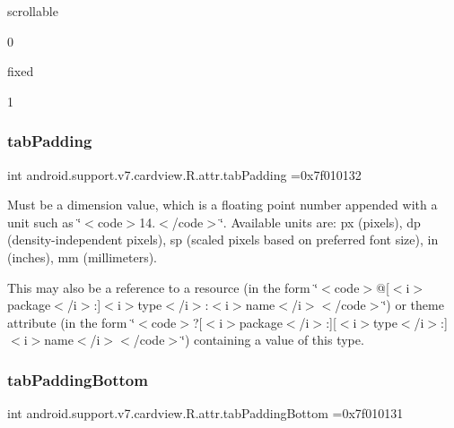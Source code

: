 {\ttfamily scrollable}

0

{\ttfamily fixed}

1\mbox{\label{classandroid_1_1support_1_1v7_1_1cardview_1_1R_1_1attr_a212c434939a73d19c290434e3cb6c8e5}} 
\subsubsection{\texorpdfstring{tab\+Padding}{tabPadding}}
{\footnotesize\ttfamily int android.\+support.\+v7.\+cardview.\+R.\+attr.\+tab\+Padding =0x7f010132\hspace{0.3cm}{\ttfamily [static]}}

Must be a dimension value, which is a floating point number appended with a unit such as \char`\"{}$<$code$>$14.\+5sp$<$/code$>$\char`\"{}. Available units are\+: px (pixels), dp (density-\/independent pixels), sp (scaled pixels based on preferred font size), in (inches), mm (millimeters). 

This may also be a reference to a resource (in the form \char`\"{}$<$code$>$@\mbox{[}$<$i$>$package$<$/i$>$\+:\mbox{]}$<$i$>$type$<$/i$>$\+:$<$i$>$name$<$/i$>$$<$/code$>$\char`\"{}) or theme attribute (in the form \char`\"{}$<$code$>$?\mbox{[}$<$i$>$package$<$/i$>$\+:\mbox{]}\mbox{[}$<$i$>$type$<$/i$>$\+:\mbox{]}$<$i$>$name$<$/i$>$$<$/code$>$\char`\"{}) containing a value of this type. \mbox{\label{classandroid_1_1support_1_1v7_1_1cardview_1_1R_1_1attr_a7133b9a847747e6ce407a36b0d131318}} 
\subsubsection{\texorpdfstring{tab\+Padding\+Bottom}{tabPaddingBottom}}
{\footnotesize\ttfamily int android.\+support.\+v7.\+cardview.\+R.\+attr.\+tab\+Padding\+Bottom =0x7f010131\hspace{0.3cm}{\ttfamily [static]}}

